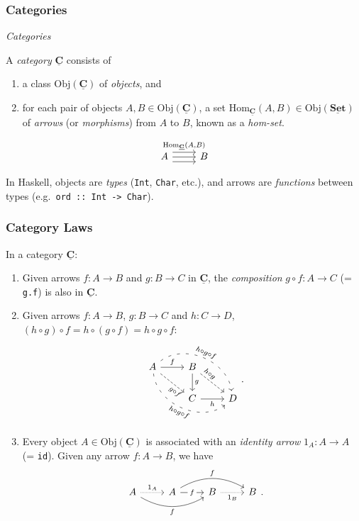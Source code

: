 \documentclass[10pt]{beamer}
\newcommand{\Cat}[1]{\ensuremath{\underline{\mathbf{#1}}}}
\newcommand{\Obj}[1]{\ensuremath{\mathrm{Obj}(\Cat{#1})}}
\newcommand{\Hom}[3]{\ensuremath{\mathrm{Hom}_{\Cat{#1}}(#2,#3)}}
\theoremstyle{definition}
\theoremstyle{remark}
\numberwithin{equation}{section}
\begin{document}
\begin{frame}[fragile]
  \frametitle{Categories}

  \emph{Categories}

  A \emph{category} $\Cat{C}$ consists of
  \begin{enumerate}
  \item a class $\Obj{C}$ of \emph{objects}, and
  \item for each pair of objects $A,B \in \Obj{C}$, a set $\Hom{C}{A}{B} \in
    \Obj{Set}$ of \emph{arrows} (or \emph{morphisms}) from $A$ to $B$, known as
    a \emph{hom-set}.
  \end{enumerate}\vspace{-1.5\baselineskip}

  \[
    \begin{tikzcd}
      A \arrow[shift left=2]{r}{\Hom{C}{A}{B}} \arrow{r} \arrow[shift right=2]{r} & B
    \end{tikzcd}
  \]

  In Haskell, objects are \emph{types} (\lstinline{Int}, \lstinline{Char}, etc.),
  and arrows are \emph{functions} between types (e.g.\ \lstinline{ord :: Int -> Char}).
\end{frame}

\begin{frame}[fragile]
  \frametitle{Category Laws}
  In a category $\Cat{C}$:
  \begin{enumerate}
  \item Given arrows $f\colon A \rightarrow B$ and $g\colon B \rightarrow C$ in
    $\Cat{C}$, the \emph{composition} $g \circ f \colon A \rightarrow C$ (= \lstinline{g.f}) is also in
    $\Cat{C}$.
  \item Given arrows $f\colon A \rightarrow B$, $g\colon B \rightarrow C$ and $h\colon C \rightarrow D$, $(h \circ
    g) \circ f = h \circ (g \circ f) = h \circ g \circ f$:\vspace{-0.5\baselineskip}
    \[
      \begin{tikzcd}
        A \arrow{r}{f} \arrow[sloped,near end,swap,dashed]{dr}{g \circ f} \arrow[bend
        right=60,sloped,swap,loosely dashed]{drr}{h \circ g \circ f} \arrow[bend
        left=60,sloped,loosely dashed]{drr}{h
          \circ g \circ f} & B \arrow{d}{g}
        \arrow[sloped,near start,dashed]{dr}{h \circ g} & \\
          & C \arrow[swap]{r}{h} & D
      \end{tikzcd}\rlap{.}
    \]
  \item Every object $A \in \Obj{C}$ is associated with an \emph{identity arrow}
    $1_A \colon A \rightarrow A$ (= \lstinline{id}). Given any arrow $f\colon A \rightarrow B$, we have
    \[
      \begin{tikzcd}
        A \arrow[densely dotted]{r}{1_A} \arrow[bend right=30,swap]{rr}{f} & A
        \arrow["f" description]{r}
        \arrow[bend left=30]{rr}{f} & B \arrow[swap,densely dotted]{r}{1_B} & B
      \end{tikzcd}\rlap{.}
    \]
  \end{enumerate}
\end{frame}
\end{document}
